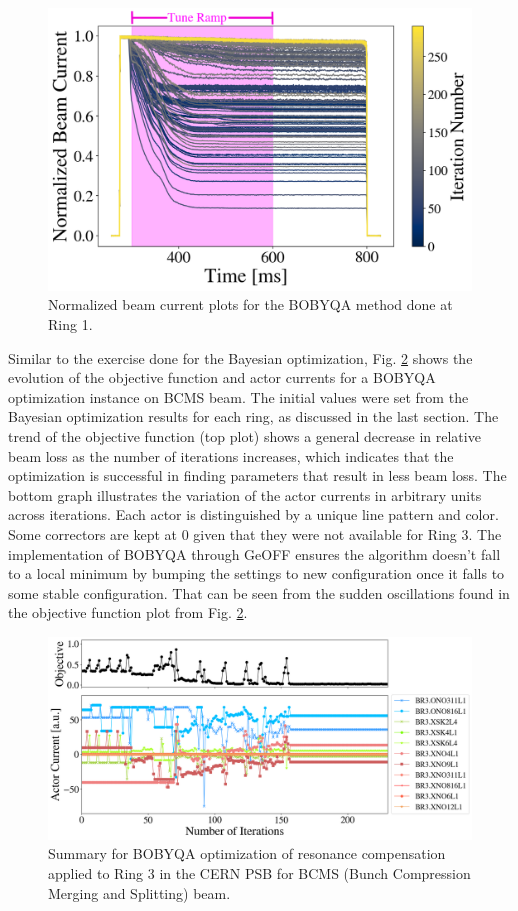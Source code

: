 \begin{figure}[H]
    \centering
    \includegraphics[width=\linewidth]{chapter5/i2_bobyqa_commented.png}
    \caption{Normalized beam current plots for the BOBYQA method done at Ring 1.}
    \label{fig:ibobyqa}
\end{figure}

Similar to the exercise done for the Bayesian optimization, Fig. \ref{fig:bobyqa1} shows the evolution of the objective function and actor currents for a BOBYQA optimization instance on BCMS beam. The initial values were set from the Bayesian optimization results for each ring, as discussed in the last section. The trend of the objective function (top plot) shows a general decrease in relative beam loss as the number of iterations increases, which indicates that the optimization is successful in finding parameters that result in less beam loss. The bottom graph illustrates the variation of the actor currents in arbitrary units across iterations. Each actor is distinguished by a unique line pattern and color. Some correctors are kept at 0 given that they were not available for Ring 3. The implementation of BOBYQA through GeOFF ensures the algorithm doesn't fall to a local minimum by bumping the settings to new configuration once it falls to some stable configuration. That can be seen from the sudden oscillations found in the objective function plot from Fig. \ref{fig:bobyqa1}.  

\begin{figure}[H]
    \centering
    \includegraphics[width=\linewidth]{chapter5/2023_05_04_R3_BCMS_bobyqa.png}
    \caption{Summary for BOBYQA optimization of resonance compensation applied to Ring 3 in the CERN PSB for BCMS (Bunch Compression Merging and Splitting) beam.}
    \label{fig:bobyqa1}
\end{figure}

